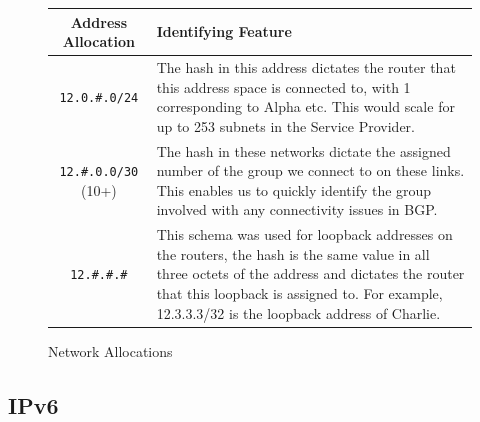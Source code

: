 \begin{figure}[!ht]
    \caption{Network Allocations}
    \label{figure:network-alloc-2}
    \centering
    \begin{tabular}{|c|p{8cm}|}
        \hline
        \textbf{Address Allocation} & \textbf{Identifying Feature} \\

        \hline
        \texttt{12.0.\#.0/24} & The hash in this address dictates the router that
        this address space is connected to, with 1 corresponding to Alpha etc.
        This would scale for up to 253 subnets in the Service Provider.\\

        \hline
        \texttt{12.\#.0.0/30} (10+) & The hash in these networks dictate the assigned
        number of the group we connect to on these links. This enables us to
        quickly identify the group involved with any connectivity issues in
        BGP.\\

        \hline
        \texttt{12.\#.\#.\#} & This schema was used for loopback addresses on the
        routers, the hash is the same value in all three octets of the address
        and dictates the router that this loopback is assigned to. For example,
        12.3.3.3/32 is the loopback address of Charlie.\\
        \hline
    \end{tabular}
\end{figure}
\clearpage

\subsection{IPv6}